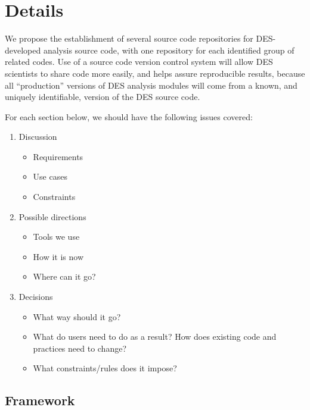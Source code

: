\documentclass[draftmode,draftwater]{memarticle}
\begin{document}
\chapter{Details}

We propose the establishment of several source code repositories for
DES-developed analysis source code, with one repository for each
identified group of related codes. Use of a source code version
control system will allow DES scientists to share code more easily,
and helps assure reproducible results, because all ``production''
versions of DES analysis modules will come from a known, and uniquely
identifiable, version of the DES source code.

\begin{fixme}
  For each section below, we should have the following issues covered:

  \begin{enumerate}
  \item Discussion
    \begin{itemize}
    \item Requirements
    \item Use cases
    \item Constraints
    \end{itemize}
  \item Possible directions
    \begin{itemize}
    \item Tools we use
    \item How it is now
    \item Where can it go?
    \end{itemize}
  \item Decisions
    \begin{itemize}
    \item What way should it go?
    \item What do users need to do as a result? How does existing code and practices need to change?
    \item What constraints/rules does it impose?
    \end{itemize}
  \end{enumerate}
\end{fixme}

\section{Framework}
\end{document}
